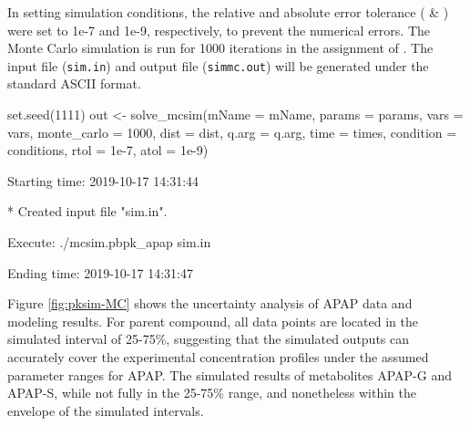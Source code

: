 In setting simulation conditions, the relative and absolute error
tolerance ( \& ) were set to 1e-7 and 1e-9,
respectively, to prevent the numerical errors. The Monte Carlo
simulation is run for 1000 iterations in the assignment of
. The input file (\texttt{sim.in}) and output file
(\texttt{simmc.out}) will be generated under the standard ASCII format.

\begin{Schunk}
\begin{Sinput}
set.seed(1111)
out <- solve_mcsim(mName = mName, params = params, vars = vars,
                   monte_carlo = 1000, dist = dist, q.arg = q.arg, 
                   time = times, condition = conditions, 
                   rtol = 1e-7, atol = 1e-9)
\end{Sinput}
\begin{Soutput}
  Starting time: 2019-10-17 14:31:44
\end{Soutput}
\begin{Soutput}
  * Created input file "sim.in".
\end{Soutput}
\begin{Soutput}
  Execute: ./mcsim.pbpk_apap sim.in
\end{Soutput}
\begin{Soutput}
  Ending time: 2019-10-17 14:31:47
\end{Soutput}
\end{Schunk}

Figure \ref{fig:pksim-MC} shows the uncertainty analysis of APAP data
and modeling results. For parent compound, all data points are located
in the simulated interval of 25-75\%, suggesting that the simulated
outputs can accurately cover the experimental concentration profiles
under the assumed parameter ranges for APAP. The simulated results of
metabolites APAP-G and APAP-S, while not fully in the 25-75\% range, and
nonetheless within the envelope of the simulated intervals.

